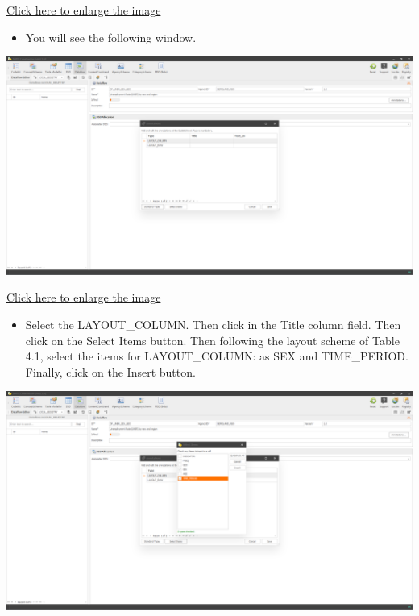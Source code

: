 \documentclass[
]{book}
\providecommand{\tightlist}{%
  \setlength{\itemsep}{0pt}\setlength{\parskip}{0pt}}
\begin{document}
\href{images/image260.png}{Click here to enlarge the image}

\begin{itemize}
\tightlist
\item
  You will see the following window.
\end{itemize}

\begin{center}\includegraphics[width=1\linewidth]{./images/image261} \end{center}

\href{images/image261.png}{Click here to enlarge the image}

\begin{itemize}
\tightlist
\item
  Select the LAYOUT\_COLUMN. Then click in the Title column field. Then click on the Select Items button. Then following the layout scheme of Table 4.1, select the items for LAYOUT\_COLUMN: as SEX and TIME\_PERIOD. Finally, click on the Insert button.
\end{itemize}

\begin{center}\includegraphics[width=1\linewidth]{./images/image262} \end{center}
\end{document}
